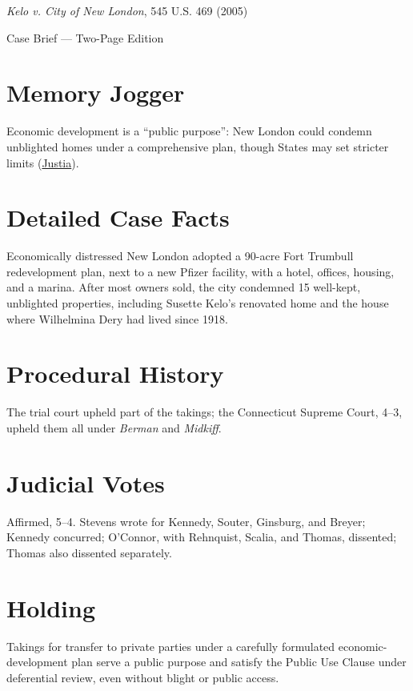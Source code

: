 \documentclass[12pt]{article}
\begin{document}
\begin{center}
{\LARGE \textit{Kelo v. City of New London}, 545 U.S. 469 (2005)\par}
\vspace{0.5em}
{\large Case Brief --- Two-Page Edition\par}
\end{center}

\section{Memory Jogger}
Economic development is a ``public purpose'': New London could condemn unblighted homes under a comprehensive plan, though States may set stricter limits (\href{https://supreme.justia.com/cases/federal/us/545/469/}{Justia}).

\section{Detailed Case Facts}
Economically distressed New London adopted a 90-acre Fort Trumbull redevelopment plan, next to a new Pfizer facility, with a hotel, offices, housing, and a marina. After most owners sold, the city condemned 15 well-kept, unblighted properties, including Susette Kelo's renovated home and the house where Wilhelmina Dery had lived since 1918.

\section{Procedural History}
The trial court upheld part of the takings; the Connecticut Supreme Court, 4--3, upheld them all under \textit{Berman} and \textit{Midkiff}.

\section{Judicial Votes}
Affirmed, 5--4. Stevens wrote for Kennedy, Souter, Ginsburg, and Breyer; Kennedy concurred; O'Connor, with Rehnquist, Scalia, and Thomas, dissented; Thomas also dissented separately.

\section{Holding}
Takings for transfer to private parties under a carefully formulated economic-development plan serve a public purpose and satisfy the Public Use Clause under deferential review, even without blight or public access.
\end{document}
